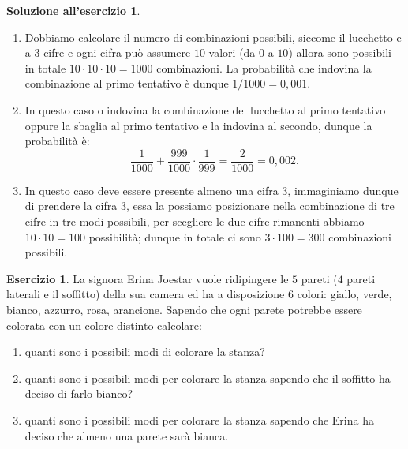 \documentclass[12pt,a4paper]{article}
\theoremstyle{definition}
\newtheorem{sol}{Soluzione all'esercizio}
\newtheorem{exe}{Esercizio}
\begin{document}
\begin{sol}\mbox{}\vspace{-0.7cm}\\
	\begin{enumerate}
		\item Dobbiamo calcolare il numero di combinazioni possibili, siccome il lucchetto e a $ 3 $ cifre e ogni cifra può assumere $ 10 $ valori (da $ 0 $ a $ 10 $) allora sono possibili in totale $ 10\cdot 10 \cdot 10 = 1000 $ combinazioni. La probabilità che indovina la combinazione al primo tentativo è dunque $ 1/1000 = 0,001 $.
		\item In questo caso o indovina la combinazione del lucchetto al primo tentativo oppure la sbaglia al primo tentativo e la indovina al secondo, dunque la probabilità è:
		      \[ \frac{1}{1000} + \frac{999}{1000}\cdot \frac{1}{999} = \frac{2}{1000} = 0,002. \]
		\item In questo caso deve essere presente almeno una cifra $ 3 $, immaginiamo dunque di prendere la cifra $ 3 $, essa la possiamo posizionare nella combinazione di tre cifre in tre modi possibili, per scegliere le due cifre rimanenti abbiamo $ 10\cdot 10 = 100 $ possibilità; dunque in totale ci sono  $ 3\cdot 100 = 300  $ combinazioni possibili.
	\end{enumerate}
\end{sol}

\begin{exe}
	La signora Erina Joestar vuole ridipingere le $ 5 $ pareti ($ 4 $ pareti laterali e il soffitto) della sua camera ed ha a disposizione $ 6 $ colori: giallo, verde, bianco, azzurro, rosa, arancione. Sapendo che ogni parete potrebbe essere colorata con un colore distinto calcolare:
	\begin{enumerate}
		\item quanti sono i possibili modi di colorare la stanza?
		\item quanti sono i possibili modi per colorare la stanza sapendo che il soffitto ha deciso di farlo bianco?
		\item quanti sono i possibili modi per colorare la stanza sapendo che Erina ha deciso che almeno una parete sarà bianca.
	\end{enumerate}
\end{exe}
\end{document}
